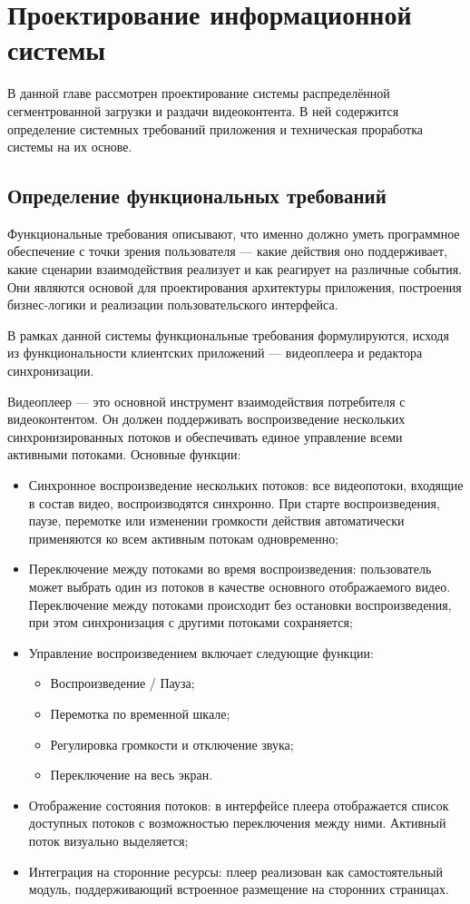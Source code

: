 \chapter{Проектирование информационной системы} \label{ch2}
	
В данной главе рассмотрен проектирование системы распределённой сегментрованной загрузки и раздачи видеоконтента. В ней содержится определение системных требований приложения и техническая проработка системы на их основе.

\section{Определение функциональных требований} \label{ch2:func_requirements}

	Функциональные требования описывают, что именно должно уметь программное обеспечение с точки зрения пользователя — какие действия оно поддерживает, какие сценарии взаимодействия реализует и как реагирует на различные события. Они являются основой для проектирования архитектуры приложения, построения бизнес-логики и реализации пользовательского интерфейса.

	В рамках данной системы функциональные требования формулируются, исходя из функциональности клиентских приложений — видеоплеера и редактора синхронизации.

	Видеоплеер — это основной инструмент взаимодействия потребителя с видеоконтентом. Он должен поддерживать воспроизведение нескольких синхронизированных потоков и обеспечивать единое управление всеми активными потоками. Основные функции:
	\begin{itemize}[label=$\bullet$]
		\item Синхронное воспроизведение нескольких потоков: все видеопотоки, входящие в состав видео, воспроизводятся синхронно. При старте воспроизведения, паузе, перемотке или изменении громкости действия автоматически применяются ко всем активным потокам одновременно;
		\item Переключение между потоками во время воспроизведения: пользователь может выбрать один из потоков в качестве основного отображаемого видео. Переключение между потоками происходит без остановки воспроизведения, при этом синхронизация с другими потоками сохраняется;
		\item Управление воспроизведением включает следующие функции:
		\begin{itemize}[label=$\circ$]
			\item Воспроизведение / Пауза;
			\item Перемотка по временной шкале;
			\item Регулировка громкости и отключение звука;
			\item Переключение на весь экран.
		\end{itemize}
		\item Отображение состояния потоков: в интерфейсе плеера отображается список доступных потоков с возможностью переключения между ними. Активный поток визуально выделяется;
		\item Интеграция на сторонние ресурсы: плеер реализован как самостоятельный модуль, поддерживающий встроенное размещение на сторонних страницах.
	\end{itemize}

